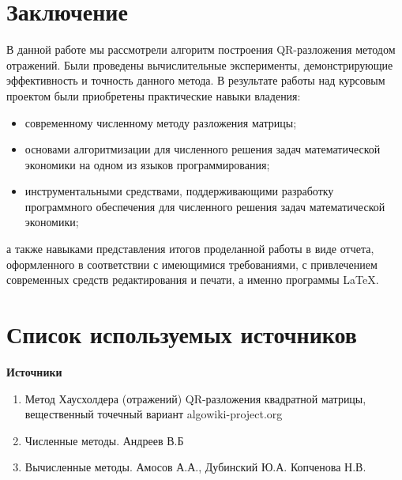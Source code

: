 \documentclass[14pt, titlepage, a4paper]{extarticle} %
\begin{document}
	\pagebreak
	
	\section*{Заключение}
	
	В данной работе мы рассмотрели алгоритм построения QR-разложения методом отражений. Были проведены вычислительные эксперименты, демонстрирующие эффективность и точность данного метода.
	В результате работы над курсовым проектом были приобретены практические навыки владения:
	\begin{itemize}
		\item современному численному методу разложения матрицы;
		\item основами алгоритмизации для численного решения задач математической экономики на одном из языков программирования;
		\item инструментальными средствами, поддерживающими разработку программного обеспечения для численного решения задач математической экономики; 
	\end{itemize}
	а также навыками представления итогов проделанной работы в виде отчета, оформленного в соответствии с имеющимися требованиями, с привлечением современных средств редактирования и печати, а именно программы LaTeX.
	
	\pagebreak

	
	\section*{Список используемых источников}
	
	\textbf{Источники}
	\begin{enumerate}
		\item Метод Хаусхолдера (отражений) QR-разложения квадратной матрицы, вещественный точечный вариант algowiki-project.org
		\item Численные методы. Андреев В.Б
		\item Вычисленные методы. Амосов А.А., Дубинский Ю.А. Копченова Н.В.
	\end{enumerate}	
	
\end{document}
